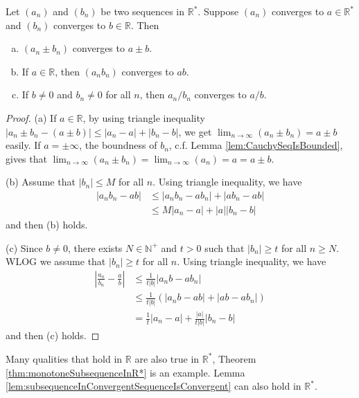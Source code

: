 \begin{thm}
  \label{thm:limitOperation}
  Let $(a_{n})$ and  $(b_{n})$ be two sequences in $\mathbb{R}^{*}$.
  Suppose $(a_{n})$ converges to $a\in \mathbb{R}^{*}$
  and $(b_{n})$ converges to $b\in \mathbb{R}$.
  Then
  \begin{enumerate}[(a)]
  \item $(a_{n}\pm b_{n})$ converges to $a\pm b$.
  \item If $a\in \mathbb{R}$, then $(a_{n}b_{n})$ converges to $ab$.
  \item If $b\ne 0$ and $b_{n}\ne 0$ for all $n$,
    then $a_{n}/b_{n}$ converges to $a/b$.
  \end{enumerate}
\end{thm}
\begin{proof}
  (a) If $a\in \mathbb{R}$, by using triangle inequality
  $|a_{n}\pm b_{n}-(a\pm b)|\le |a_{n}-a|+|b_{n}-b|$,
  we get $\lim_{n\rightarrow \infty}(a_{n}\pm b_{n})=a\pm b$ easily.
  If $a=\pm\infty$, the boundness of $b_{n}$, 
  c.f. Lemma \ref{lem:CauchySeqIsBounded}, gives that
  $\lim_{n\rightarrow\infty}(a_{n}\pm b_{n})
  =\lim_{n\rightarrow\infty}(a_{n})=a=a\pm b$.

  (b) Assume that $|b_{n}|\le M$ for all $n$. Using triangle inequality,
  we have
  \begin{align*}
    |a_{n}b_{n}-ab|
    &\le |a_{n}b_{n}-ab_{n}|+|ab_{n}-ab|\\
    &\le M|a_{n}-a|+|a||b_{n}-b|
  \end{align*}
  and then (b) holds.

  (c) Since $b\ne 0$, there exists $N\in \mathbb{N}^{+}$ and $t>0$
  such that $|b_{n}|\ge t$ for all $n\ge N$. WLOG we assume that
  $|b_{n}|\ge t$ for all $n$. Using triangle inequality, we have
  \begin{align*}
    \left| \frac{a_{n}}{b_{n}}-\frac{a}{b} \right|
    &\le \frac{1}{t|b|}|a_{n}b-ab_{n}| \\
    &\le \frac{1}{t|b|}(|a_{n}b-ab|+|ab-ab_{n}|) \\
    &=\frac{1}{t}|a_{n}-a|+\frac{|a|}{t|b|}|b_{n}-b|
  \end{align*}
  and then (c) holds.
\end{proof}

\begin{rem}
  Many qualities that hold in $\mathbb{R}$ are also true in
  $\mathbb{R}^{*}$, Theorem \ref{thm:monotoneSubsequenceInR*}
  is an example.
  Lemma \ref{lem:subsequenceInConvergentSequenceIsConvergent}
  can also hold in $\mathbb{R}^{*}$.
\end{rem}

